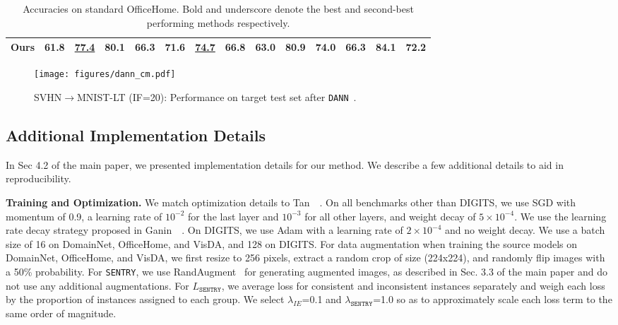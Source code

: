 \documentclass[10pt,twocolumn,letterpaper]{article}
\newcommand{\method}{\texttt{SENTRY}\xspace}
\begin{document}
\begin{table*}[t]
\begin{center}
{\begin{tabular}{lccccccccccccc}
    \midrule
    Ours & \textbf{61.8} & \underline{77.4} & \textbf{80.1} & \textbf{66.3} & 71.6 & \underline{74.7} & \textbf{66.8} & \textbf{63.0} & \textbf{80.9} & \textbf{74.0} & \textbf{66.3} & \textbf{84.1} & \textbf{72.2} \\
    \bottomrule
    \end{tabular}}
    \caption{Accuracies on standard OfficeHome. Bold and underscore denote the best and second-best performing methods respectively.}
    \label{tab:officehome_std}
    \end{center}
\end{table*}


\begin{figure*}[t]
    \centering
    \texttt{[image: figures/dann\_cm.pdf]}
    \caption{
        SVHN$\rightarrow$MNIST-LT (IF=20): Performance on target test set after \texttt{DANN}~\cite{ganin2014unsupervised}.
    }
    \label{fig:dann_cm}
 \end{figure*}

\subsection{Additional Implementation Details} 

In Sec 4.2 of the main paper, we presented implementation details for our method. We describe a few additional details to aid in reproducibility.


\noindent \textbf{Training and Optimization.} We match optimization details to Tan~\etal~\cite{tan2019generalized}. On all benchmarks other than DIGITS, we use SGD with momentum of 0.9, a learning rate of $10^{-2}$ for the last layer and $10^{-3}$ for all other layers, and weight decay of $5\times10^{-4}$. We use the learning rate decay strategy proposed in Ganin~\etal~\cite{ganin2014unsupervised}. On DIGITS, we use Adam with a learning rate of $2\times10^{-4}$ and no weight decay. We use a batch size of 16 on DomainNet, OfficeHome, and VisDA, and 128 on DIGITS. For data augmentation when training the source models on DomainNet, OfficeHome, and VisDA, we first resize to 256 pixels, extract a random crop of size (224x224), and randomly flip images with a 50\% probability. For \method, we use RandAugment~\cite{cubuk2020randaugment} for generating augmented images, as described in Sec. 3.3 of the main paper and do not use any additional augmentations. For $L_{\method}$, we average loss for consistent and inconsistent instances separately and weigh each loss by the proportion of instances assigned to each group. We select $\lambda_{IE}$=0.1 and $\lambda_{\method}$=1.0 so as to approximately scale each loss term to the same order of magnitude.
\end{document}
